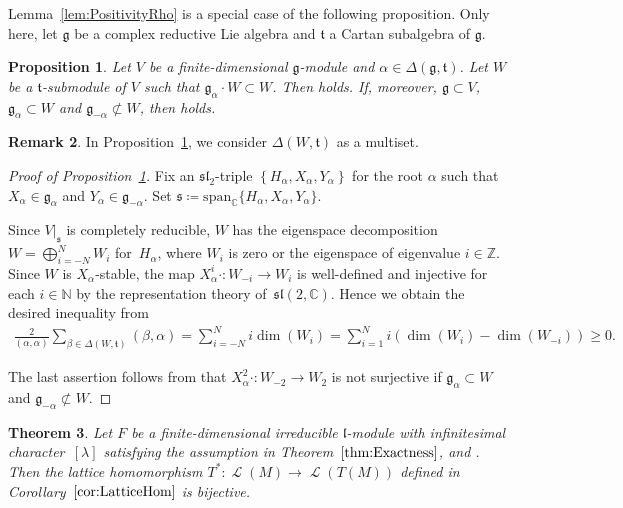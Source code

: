 \documentclass[10pt,a4paper]{amsart}
\numberwithin{equation}{section}
\newtheorem{Theorem}{Theorem}[section]
\newtheorem{Proposition}[Theorem]{Proposition}
\theoremstyle{definition}
\newtheorem{Remark}[Theorem]{Remark}
\newcommand{\spn}[1]{\mathrm{span}_{\CC}\{#1\}}
\newcommand{\set}[1]{\left\{#1 \right\}}
\newcommand{\BasicRing}[1]{\mathbb{#1}}
\newcommand{\ZZ}{\BasicRing{Z}}
\newcommand{\NN}{\BasicRing{N}}
\newcommand{\CC}{\BasicRing{C}}
\newcommand{\lie}[1]{\mathfrak{#1}}
\newcommand{\BGGcat}[2]{\mathcal{O}_{\lie{#2}}^{\lie{#1}}}
\DeclareMathOperator{\lattice}{\mathcal{L}}
\begin{document}
Lemma~\ref{lem:PositivityRho} is a special case of the following proposition.
Only here, let $\lie{g}$ be a complex reductive Lie algebra and $\lie{t}$ a Cartan subalgebra of $\lie{g}$.

\begin{Proposition}\label{prop:PositivityRho}
	Let $V$ be a finite-dimensional $\lie{g}$-module and $\alpha \in \Delta(\lie{g}, \lie{t})$.
	Let $W$ be a $\lie{t}$-submodule of $V$ such that $\lie{g}_{\alpha} \cdot W \subset W$.
	Then \smash{$\sum_{\beta \in \Delta(W, \lie{t})}(\beta, \alpha) \geq 0$} holds.
	If, moreover, $\lie{g}\subset V$, $\lie{g}_{\alpha} \subset W$ and $\lie{g}_{-\alpha} \not\subset W$,
	then \smash{$\sum_{\beta \in \Delta(W, \lie{t})}(\beta, \alpha) > 0$} holds.
\end{Proposition}

\begin{Remark}
	In Proposition~\ref{prop:PositivityRho}, we consider $\Delta(W, \lie{t})$ as a multiset.
\end{Remark}
	
\begin{proof}[Proof of Proposition~\ref{prop:PositivityRho}]
	Fix an $\lie{sl}_2$-triple $\set{H_\alpha, X_\alpha, Y_\alpha}$ for the root $\alpha$ such that $X_\alpha \in \lie{g}_{\alpha}$ and $Y_\alpha \in \lie{g}_{-\alpha}$.
	Set $\lie{s}\coloneq \spn{H_\alpha, X_\alpha, Y_\alpha}$.

	Since $V|_{\lie{s}}$ is completely reducible, $W$ has the eigenspace decomposition
	$W = \bigoplus_{i = -N}^N W_i$ for~$H_\alpha$, where $W_i$ is zero or the eigenspace of eigenvalue $i \in \ZZ$.
	Since $W$ is $X_\alpha$-stable, the map $X_\alpha^i\cdot \colon W_{-i} \rightarrow W_{i}$
	is well-defined and injective for each $i \in \NN$ by the representation theory of~$\lie{sl}(2,\CC)$.
	Hence we obtain the desired inequality from
	\begin{align*}
		\frac{2}{(\alpha, \alpha)} \sum_{\beta \in \Delta(W, \lie{t})} (\beta, \alpha) = \sum_{i=-N}^N i\dim(W_i)
	 = \sum_{i=1}^N i(\dim(W_i) - \dim(W_{-i})) \geq 0.
	\end{align*}
	
	The last assertion follows from that $X_\alpha^2\cdot \colon W_{-2} \rightarrow W_{2}$ is not surjective
	if $\lie{g}_{\alpha} \subset W$ and $\lie{g}_{-\alpha} \not\subset W$.
\end{proof}

\begin{Theorem}\label{thm:ReductionToScalar}
	Let $F$ be a finite-dimensional irreducible $\lie{l}$-module with infinitesimal character~$[\lambda]$ satisfying the assumption in Theorem~$\ref{thm:Exactness}$,
	and \smash{$M \in \BGGcat{g'}{q'}(F)$}.
	Then the lattice homomorphism $T^*\colon \lattice(M) \rightarrow \lattice(T(M))$ defined in Corollary~$\ref{cor:LatticeHom}$ is bijective.
\end{Theorem}
\end{document}
